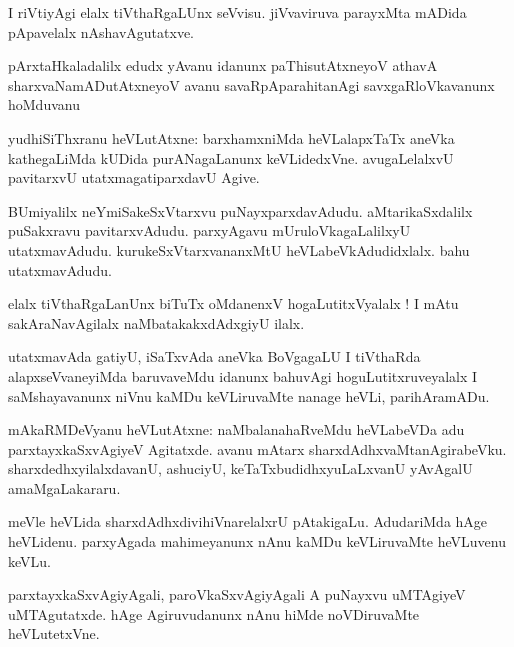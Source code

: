 \documentclass{article}
\begin{document}
\begin{mn}
I riVtiyAgi elalx tiVthaRgaLUnx seVvisu. jiVvaviruva parayxMta mADida pApavelalx nAshavAgutatxve.
\end{mn}

\begin{mn}
pArxtaHkaladalilx edudx yAvanu idanunx paThisutAtxneyoV athavA sharxvaNamADutAtxneyoV avanu 
savaRpAparahitanAgi savxgaRloVkavanunx hoMduvanu
\end{mn}



\begin{mn}
yudhiSiThxranu heVLutAtxne: barxhamxniMda heVLalapxTaTx aneVka kathegaLiMda kUDida purANagaLanunx 
keVLidedxVne. avugaLelalxvU pavitarxvU utatxmagatiparxdavU Agive.
\end{mn}

\begin{mn}
BUmiyalilx neYmiSakeSxVtarxvu puNayxparxdavAdudu. aMtarikaSxdalilx puSakxravu pavitarxvAdudu. 
parxyAgavu mUruloVkagaLalilxyU utatxmavAdudu. kurukeSxVtarxvananxMtU heVLabeVkAdudidxlalx. bahu 
utatxmavAdudu.
\end{mn}

\begin{mn}
elalx tiVthaRgaLanUnx biTuTx oMdanenxV hogaLutitxVyalalx ! I mAtu sakAraNavAgilalx 
naMbatakakxdAdxgiyU ilalx.
\end{mn}

\begin{mn}
utatxmavAda gatiyU, iSaTxvAda aneVka BoVgagaLU I tiVthaRda alapxseVvaneyiMda baruvaveMdu idanunx 
bahuvAgi hoguLutitxruveyalalx I saMshayavanunx niVnu kaMDu keVLiruvaMte nanage heVLi, parihAramADu.
\end{mn}

\begin{mn}
mAkaRMDeVyanu heVLutAtxne: naMbalanahaRveMdu heVLabeVDa adu parxtayxkaSxvAgiyeV Agitatxde. avanu 
mAtarx sharxdAdhxvaMtanAgirabeVku. sharxdedhxyilalxdavanU, ashuciyU, keTaTxbudidhxyuLaLxvanU 
yAvAgalU amaMgaLakararu.
\end{mn}

\begin{mn}
meVle heVLida sharxdAdhxdivihiVnarelalxrU pAtakigaLu. AdudariMda hAge heVLidenu. parxyAgada 
mahimeyanunx nAnu kaMDu keVLiruvaMte heVLuvenu keVLu.
\end{mn}

\begin{mn}
parxtayxkaSxvAgiyAgali, paroVkaSxvAgiyAgali A puNayxvu uMTAgiyeV uMTAgutatxde. hAge Agiruvudanunx 
nAnu hiMde noVDiruvaMte heVLutetxVne.
\end{mn}
\end{document}
